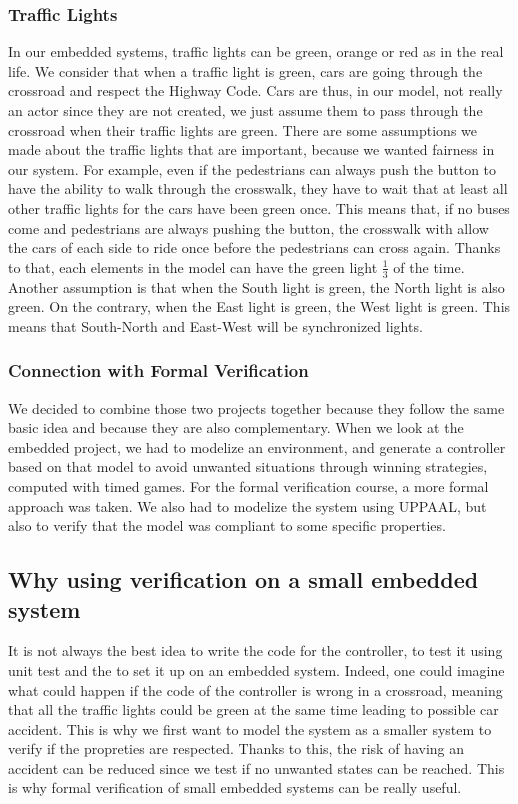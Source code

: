 \subsubsection{Traffic Lights}
In our embedded systems, traffic lights can be green, orange or red as in the real life. We consider that when a traffic light is green, cars are going through the crossroad and respect the Highway Code. Cars are thus, in our model, not really an actor since they are not created, we just assume them to pass through the crossroad when their traffic lights are green. 
There are some assumptions we made about the traffic lights that are important, because we wanted fairness in our system. For example, even if the pedestrians can always push the button to have the ability to walk through the crosswalk, they have to wait that at least all other traffic lights for the cars have been green once. This means that, if no buses come and pedestrians are always pushing the button, the crosswalk with allow the cars of each side to ride once before the pedestrians can cross again. Thanks to that, each elements in the model can have the green light $\frac{1}{3}$ of the time.
Another assumption is that when the South light is green, the North light is also green. On the contrary, when the East light is green, the West light is green. This means that South-North and East-West will be synchronized lights.

\subsubsection{Connection with Formal Verification}
We decided to combine those two projects together because they follow the same basic idea and because they are also complementary. When we look at the embedded project, we had to modelize an environment, and generate a controller based on that model to avoid unwanted situations through winning strategies, computed with timed games. For the formal verification course, a more formal approach was taken. We also had to modelize the system using UPPAAL, but also to verify that the model was compliant to some specific properties. 

\subsection{Why using verification on a small embedded system}
It is not always the best idea to write the code for the controller, to test it using unit test and the to set it up on an embedded system. Indeed, one could imagine what could happen if the code of the controller is wrong in a crossroad, meaning that all the traffic lights could be green at the same time leading to possible car accident. This is why we first want to model the system as a smaller system to verify if the propreties are respected. Thanks to this, the risk of having an accident can be reduced since we test if no unwanted states can be reached. This is why formal verification of small embedded systems can be really useful.
